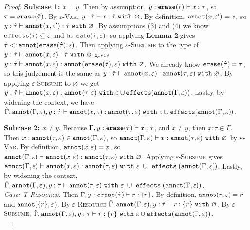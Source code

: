 \begin{appendix}
\begin{proof}
\textbf{Subcase 1: $x = y$}. Then by assumption, $y: \mathtt{erase}(\hat \tau) \vdash x: \tau$, so $\tau = \mathtt{erase}(\hat \tau)$. By \textsc{$\varepsilon$-Var}, $y: \hat \tau \vdash x: \hat \tau~\mathtt{with}~ \varnothing$. By definition, $\mathtt{annot}(x, \varepsilon') = x$, so $y: \hat \tau \vdash \mathtt{annot}(x, \varepsilon'): \hat \tau~\mathtt{with}~ \varnothing$. By assumptions (3) and (4) we know $\mathtt{effects}(\hat \tau) \subseteq \varepsilon$ and $\mathtt{ho \hbox{-} safe}(\hat \tau, \varepsilon)$, so applying \textbf{Lemma 2} gives $\hat \tau <: \mathtt{annot}(\mathtt{erase}(\hat \tau), \varepsilon)$. Then applying \textsc{$\varepsilon$-Subsume} to the type of $y: \hat \tau \vdash \mathtt{annot}(x, \varepsilon): \hat \tau~\mathtt{with}~ \varnothing$ gives $y: \hat \tau \vdash \mathtt{annot}(x, \varepsilon): \mathtt{annot}(\mathtt{erase}(\hat \tau), \varepsilon)~\mathtt{with}~ \varnothing$. We already know $\mathtt{erase}(\hat \tau) = \tau$, so this judgement is the same as $y: \hat \tau \vdash \mathtt{annot}(x, \varepsilon): \mathtt{annot}(\tau, \varepsilon)~\mathtt{with}~ \varnothing$. By applying \textsc{$\varepsilon$-Subsume} to $\varnothing$ we get $y: \hat \tau \vdash \mathtt{annot}(x, \varepsilon): \mathtt{annot}(\tau, \varepsilon)~\mathtt{with}~ \varepsilon \cup \mathtt{effects}(\mathtt{annot}(\Gamma, \varepsilon))$. Lastly, by widening the context, we have $\hat \Gamma, \mathtt{annot}(\Gamma, \varepsilon), y: \hat \tau \vdash \mathtt{annot}(x, \varepsilon): \mathtt{annot}(\tau, \varepsilon)~\mathtt{with}~ \varepsilon \cup \mathtt{effects}(\mathtt{annot}(\Gamma, \varepsilon))$.

\textbf{Subcase 2: $x \neq y$}. Because $\Gamma, y: \mathtt{erase}(\hat \tau) \vdash x: \tau$, and $x \neq y$, then $x: \tau \in \Gamma$. Then $x: \mathtt{annot}(\tau, \varepsilon) \in \mathtt{annot}(\Gamma, \varepsilon)$, so $\mathtt{annot}(\Gamma, \varepsilon) \vdash x: \mathtt{annot}(\tau, \varepsilon)~\mathtt{with}~ \varnothing$ by \textsc{$\varepsilon$-Var}. By definition, $\mathtt{annot}(x, \varepsilon) = x$, so $\mathtt{annot}(\Gamma, \varepsilon) \vdash \mathtt{annot}(x, \varepsilon): \mathtt{annot}(\tau, \varepsilon)~\mathtt{with}~ \varnothing$. Applying \textsc{$\varepsilon$-Subsume} gives $\mathtt{annot}(\Gamma, \varepsilon) \vdash \mathtt{annot}(x, \varepsilon): \mathtt{annot}(\tau, \varepsilon)~\mathtt{with}~ \varepsilon~\cup~\mathtt{effects}~(\mathtt{annot}(\Gamma, \varepsilon))$. Lastly, by widening the context, $\hat \Gamma, \mathtt{annot}(\Gamma, \varepsilon), y: \hat \tau \vdash \mathtt{annot}(\tau, \varepsilon)~\mathtt{with}~ \varepsilon~\cup~\mathtt{effects}~(\mathtt{annot}(\Gamma, \varepsilon))$.\\

\textit{Case: \textsc{T-Resource}}. Then $\Gamma, y: \mathtt{erase}(\hat \tau) \vdash r : \{ r \}$. By definition, $\mathtt{annot}(r, \varepsilon) = r$ and $\mathtt{annot}(\{ r \}, \varepsilon$). By \textsc{$\varepsilon$-Resource}  $\hat \Gamma, \mathtt{annot}(\Gamma, \varepsilon), y: \hat \tau \vdash r: \{ r \}~\mathtt{with}~ \varnothing$. By \textsc{$\varepsilon$-Subsume}, $\hat \Gamma, \mathtt{annot}(\Gamma, \varepsilon), y: \hat \tau \vdash r: \{ r \}~\mathtt{with}~ \varepsilon \cup \mathtt{effects}(\mathtt{annot}(\Gamma, \varepsilon))$.\\


\end{proof}
\end{appendix}
